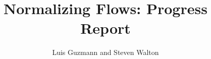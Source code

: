 \documentclass[12pt,letter]{article}
\begin{document}
\title{Normalizing Flows: Progress Report}
\author{Luis Guzmann and Steven Walton}
\maketitle








 
 
\end{document}
